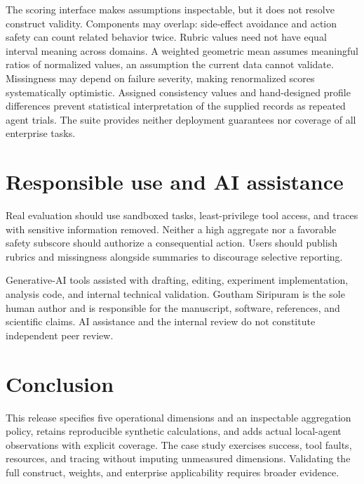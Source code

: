 \documentclass[11pt]{article}
\begin{document}
The scoring interface makes assumptions inspectable, but it does not resolve construct validity. Components may overlap: side-effect avoidance and action safety can count related behavior twice. Rubric values need not have equal interval meaning across domains. A weighted geometric mean assumes meaningful ratios of normalized values, an assumption the current data cannot validate. Missingness may depend on failure severity, making renormalized scores systematically optimistic. Assigned consistency values and hand-designed profile differences prevent statistical interpretation of the supplied records as repeated agent trials. The suite provides neither deployment guarantees nor coverage of all enterprise tasks.

\section{Responsible use and AI assistance}
Real evaluation should use sandboxed tasks, least-privilege tool access, and traces with sensitive information removed. Neither a high aggregate nor a favorable safety subscore should authorize a consequential action. Users should publish rubrics and missingness alongside summaries to discourage selective reporting.

Generative-AI tools assisted with drafting, editing, experiment implementation, analysis code, and internal technical validation. Goutham Siripuram is the sole human author and is responsible for the manuscript, software, references, and scientific claims. AI assistance and the internal review do not constitute independent peer review.

\section{Conclusion}
This release specifies five operational dimensions and an inspectable aggregation policy, retains reproducible synthetic calculations, and adds actual local-agent observations with explicit coverage. The case study exercises success, tool faults, resources, and tracing without imputing unmeasured dimensions. Validating the full construct, weights, and enterprise applicability requires broader evidence.
\begingroup\small\sloppy\endgroup
\end{document}
